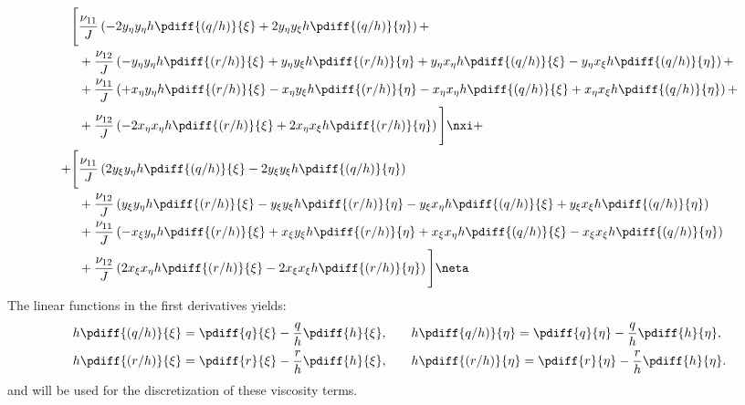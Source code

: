 \begin{align}
    \Bigg[ &  \frac{\nu_{11}}{J} \left(
    - 2 y_{\eta} y_{\eta} h \pdiff{(q/h)}{\xi}
    + 2 y_{\eta} y_{\xi} h \pdiff{(q/h)}{\eta} \right)
    +
    \\* & +
    \frac{\nu_{12}}{J} \left(
    - y_{\eta}y_{\eta} h \pdiff{(r/h)}{\xi}
    + y_{\eta}y_{\xi} h \pdiff{(r/h)}{\eta}
    + y_{\eta}x_{\eta} h \pdiff{(q/h)}{\xi}
    - y_{\eta}x_{\xi} h \pdiff{(q/h)}{\eta} \right) +
    \\* & +
    \frac{\nu_{11}}{J} \left(
    + x_{\eta}y_{\eta} h \pdiff{(r/h)}{\xi}
    - x_{\eta}y_{\xi} h \pdiff{(r/h)}{\eta}
    - x_{\eta}x_{\eta} h \pdiff{(q/h)}{\xi}
    + x_{\eta}x_{\xi} h \pdiff{(q/h)}{\eta}
    \right) +
    \\* & +
    \frac{\nu_{12}}{J} \left(
    - 2 x_{\eta}x_{\eta} h \pdiff{(r/h)}{\xi}
    + 2 x_{\eta}x_{\xi} h \pdiff{(r/h)}{\eta}
    \right)
    \Bigg] \nxi +
    \\
    + \Bigg[ &
    \frac{\nu_{11}}{J} \left(
    2 y_{\xi}  y_{\eta} h \pdiff{(q/h)}{\xi}
    - 2 y_{\xi} y_{\xi} h \pdiff{(q/h)}{\eta}
    \right)
    \\* & +
    \frac{\nu_{12}}{J} \left(
    y_{\xi}y_{\eta} h \pdiff{(r/h)}{\xi}
    - y_{\xi}y_{\xi} h \pdiff{(r/h)}{\eta}
    - y_{\xi}x_{\eta} h \pdiff{(q/h)}{\xi}
    + y_{\xi}x_{\xi} h \pdiff{(q/h)}{\eta}
    \right)
    \\* & +
    \frac{\nu_{11}}{J} \left(
    - x_{\xi}y_{\eta} h \pdiff{(r/h)}{\xi}
    + x_{\xi}y_{\xi} h \pdiff{(r/h)}{\eta}
    + x_{\xi}x_{\eta} h \pdiff{(q/h)}{\xi}
    - x_{\xi}x_{\xi} h \pdiff{(q/h)}{\eta}
    \right)
    \\* & +
    \frac{\nu_{12}}{J} \left(
    2 x_{\xi}x_{\eta} h \pdiff{(r/h)}{\xi}
    - 2 x_{\xi}x_{\xi} h \pdiff{(r/h)}{\eta}
    \right)
    \Bigg] \neta \label{eq:xi_greens_viscous_term_coord}
\end{align}
%
The linear functions in the first derivatives yields:
\begin{align}
    h \pdiff{(q/h)}{\xi} = \pdiff{q}{\xi} - \frac{q}{h}\pdiff{h}{\xi},
    & \qquad h \pdiff{q/h)}{\eta} = \pdiff{q}{\eta} - \frac{q}{h}\pdiff{h}{\eta},
    \\*
    h \pdiff{(r/h)}{\xi} = \pdiff{r}{\xi} - \frac{r}{h}\pdiff{h}{\xi},
    & \qquad h\pdiff{(r/h)}{\eta} = \pdiff{r}{\eta} - \frac{r}{h}\pdiff{h}{\eta}.
\end{align}
and will be used for the discretization of these viscosity terms.
